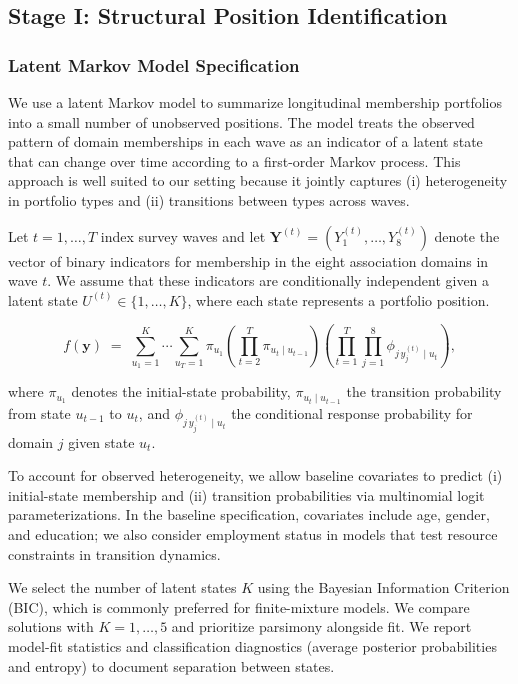 \subsection{Stage I: Structural Position Identification}

\subsubsection{Latent Markov Model Specification}

We use a latent Markov model to summarize longitudinal membership portfolios into a small number of unobserved positions. The model treats the observed pattern of domain memberships in each wave as an indicator of a latent state that can change over time according to a first-order Markov process. This approach is well suited to our setting because it jointly captures (i) heterogeneity in portfolio types and (ii) transitions between types across waves.

Let $t=1,\ldots,T$ index survey waves and let $\mathbf{Y}^{(t)}=(Y^{(t)}_{1},\ldots,Y^{(t)}_{8})$ denote the vector of binary indicators for membership in the eight association domains in wave $t$. We assume that these indicators are conditionally independent given a latent state $U^{(t)}\in\{1,\ldots,K\}$, where each state represents a portfolio position.

\begin{equation}
f(\mathbf{y}) \;=\; \sum_{u_1=1}^{K} \cdots \sum_{u_T=1}^{K}
\pi_{u_1}\left(\prod_{t=2}^{T}\pi_{u_t\mid u_{t-1}}\right)
\left(\prod_{t=1}^{T}\prod_{j=1}^{8}\phi_{j\, y_j^{(t)}\mid u_t}\right),
\end{equation}

where $\pi_{u_1}$ denotes the initial-state probability, $\pi_{u_t\mid u_{t-1}}$ the transition probability from state $u_{t-1}$ to $u_t$, and $\phi_{j\, y_j^{(t)}\mid u_t}$ the conditional response probability for domain $j$ given state $u_t$.

To account for observed heterogeneity, we allow baseline covariates to predict (i) initial-state membership and (ii) transition probabilities via multinomial logit parameterizations. In the baseline specification, covariates include age, gender, and education; we also consider employment status in models that test resource constraints in transition dynamics.

We select the number of latent states $K$ using the Bayesian Information Criterion (BIC), which is commonly preferred for finite-mixture models. We compare solutions with $K=1,\ldots,5$ and prioritize parsimony alongside fit. We report model-fit statistics and classification diagnostics (average posterior probabilities and entropy) to document separation between states.

